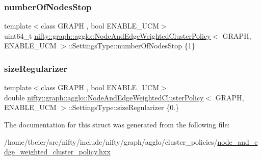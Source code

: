 \subsubsection{\texorpdfstring{number\+Of\+Nodes\+Stop}{numberOfNodesStop}}
{\footnotesize\ttfamily template$<$class G\+R\+A\+PH , bool E\+N\+A\+B\+L\+E\+\_\+\+U\+CM$>$ \\
uint64\+\_\+t \hyperlink{classnifty_1_1graph_1_1agglo_1_1NodeAndEdgeWeightedClusterPolicy}{nifty\+::graph\+::agglo\+::\+Node\+And\+Edge\+Weighted\+Cluster\+Policy}$<$ G\+R\+A\+PH, E\+N\+A\+B\+L\+E\+\_\+\+U\+CM $>$\+::Settings\+Type\+::number\+Of\+Nodes\+Stop \{1\}}

\mbox{\label{structnifty_1_1graph_1_1agglo_1_1NodeAndEdgeWeightedClusterPolicy_1_1SettingsType_aca88c9142fbe9a8789c52042136f7726}} 
\subsubsection{\texorpdfstring{size\+Regularizer}{sizeRegularizer}}
{\footnotesize\ttfamily template$<$class G\+R\+A\+PH , bool E\+N\+A\+B\+L\+E\+\_\+\+U\+CM$>$ \\
double \hyperlink{classnifty_1_1graph_1_1agglo_1_1NodeAndEdgeWeightedClusterPolicy}{nifty\+::graph\+::agglo\+::\+Node\+And\+Edge\+Weighted\+Cluster\+Policy}$<$ G\+R\+A\+PH, E\+N\+A\+B\+L\+E\+\_\+\+U\+CM $>$\+::Settings\+Type\+::size\+Regularizer \{0.\}}



The documentation for this struct was generated from the following file\+:\begin{DoxyCompactItemize}
\item 
/home/tbeier/src/nifty/include/nifty/graph/agglo/cluster\+\_\+policies/\hyperlink{node__and__edge__weighted__cluster__policy_8hxx}{node\+\_\+and\+\_\+edge\+\_\+weighted\+\_\+cluster\+\_\+policy.\+hxx}\end{DoxyCompactItemize}
